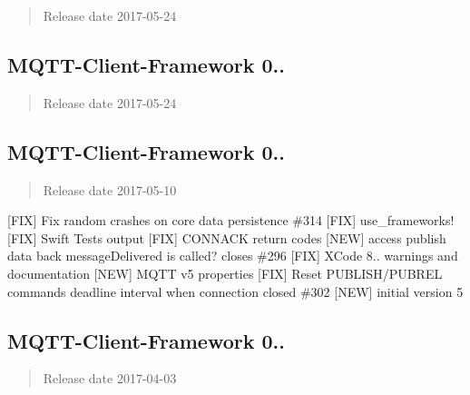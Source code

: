 \begin{quote}
Release date 2017-\/05-\/24 \end{quote}


\subsection*{M\+Q\+T\+T-\/\+Client-\/\+Framework 0..}

\begin{quote}
Release date 2017-\/05-\/24 \end{quote}


\subsection*{M\+Q\+T\+T-\/\+Client-\/\+Framework 0..}

\begin{quote}
Release date 2017-\/05-\/10 \end{quote}


\mbox{[}F\+IX\mbox{]} Fix random crashes on core data persistence \#314 \mbox{[}F\+IX\mbox{]} use\+\_\+frameworks! \mbox{[}F\+IX\mbox{]} Swift Tests output \mbox{[}F\+IX\mbox{]} C\+O\+N\+N\+A\+CK return codes \mbox{[}N\+EW\mbox{]} access publish data back message\+Delivered is called? closes \#296 \mbox{[}F\+IX\mbox{]} X\+Code 8.. warnings and documentation \mbox{[}N\+EW\mbox{]} M\+Q\+TT v5 properties \mbox{[}F\+IX\mbox{]} Reset P\+U\+B\+L\+I\+S\+H/\+P\+U\+B\+R\+EL command\textquotesingle{}s deadline interval when connection closed \#302 \mbox{[}N\+EW\mbox{]} initial version 5

\subsection*{M\+Q\+T\+T-\/\+Client-\/\+Framework 0..}

\begin{quote}
Release date 2017-\/04-\/03 \end{quote}


